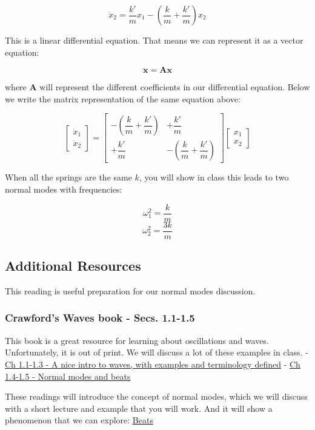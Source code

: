 \[\ddot{x}_{2} = \dfrac{k'}{m}x_1 - \left(\dfrac{k}{m}+\dfrac{k'}{m}\right)x_2\]

This is a linear differential equation. That means we can represent it
as a vector equation:

\[\ddot{\mathbf{x}} = \pmb{A} \mathbf{x}\]

where \(\pmb{A}\) will represent the different coefficients in our
differential equation. Below we write the matrix representation of the
same equation above:

\[\begin{bmatrix}
\ddot{x}_1\\
\ddot{x}_2
\end{bmatrix} = \begin{bmatrix}
-\left(\dfrac{k}{m}+\dfrac{k'}{m}\right) & +\dfrac{k'}{m}\\
+\dfrac{k'}{m} & -\left(\dfrac{k}{m}+\dfrac{k'}{m}\right)
\end{bmatrix}
\begin{bmatrix}
{x}_1\\
{x}_2
\end{bmatrix}
\]

When all the springs are the same \(k\), you will show in class this
leads to two normal modes with frequencies:

\[\omega_1^2 = \dfrac{k}{m}\] \[\omega_2^2 = \dfrac{3k}{m}\]

\subsection{Additional Resources}\label{additional-resources}

This reading is useful preparation for our normal modes discussion.

\subsubsection{Crawford's Waves book - Secs.
1.1-1.5}\label{crawfords-waves-book---secs.-1.1-1.5}

This book is a great resource for learning about oscillations and waves.
Unfortunately, it is out of print. We will discuss a lot of these
examples in class. -
\href{../assets/scans/Crawford-Waves-Secs_1.1-1.3.pdf}{Ch 1.1-1.3 - A
nice intro to waves, with examples and terminology defined} -
\href{../assets/scans/Crawford-Waves-Secs_1.4-1.5.pdf}{Ch 1.4-1.5 -
Normal modes and beats}

These readings will introduce the concept of normal modes, which we will
discuss with a short lecture and example that you will work. And it will
show a phenomenon that we can explore:
\href{https://en.wikipedia.org/wiki/Beat_(acoustics)}{Beats}


